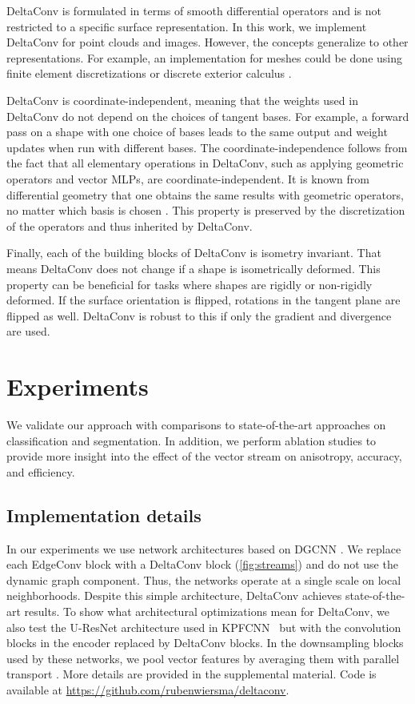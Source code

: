 \documentclass[acmtog, authorversion]{acmart}
\begin{document}
DeltaConv is formulated in terms of smooth differential operators and is not restricted to a specific surface representation. In this work, we implement DeltaConv for point clouds and images. However, the concepts generalize to other representations. For example, an implementation for meshes could be done using finite element discretizations \cite{Brandt2017} or discrete exterior calculus \cite{Crane2013DGP}.

DeltaConv is coordinate-independent, meaning that the weights used in DeltaConv do not depend on the choices of tangent bases. For example, a forward pass on a shape with one choice of bases leads to the same output and weight updates when run with different bases.
The coordinate-independence follows from the fact that all elementary operations in DeltaConv, such as applying geometric operators and vector MLPs, are coordinate-independent. It is known from differential geometry that one obtains the same results with geometric operators, no matter which basis is chosen \cite{o1983semi}. This property is preserved by the discretization of the operators and thus inherited by DeltaConv.

Finally, each of the building blocks of DeltaConv is isometry invariant. That means DeltaConv does not change if a shape is isometrically deformed. This property can be beneficial for tasks where shapes are rigidly or non-rigidly deformed. If the surface orientation is flipped, rotations in the tangent plane are flipped as well. DeltaConv is robust to this if only the gradient and divergence are used.
 \section{Experiments}
We validate our approach with comparisons to state-of-the-art approaches on classification and segmentation. In addition, we perform ablation studies to provide more insight into the effect of the vector stream on anisotropy, accuracy, and efficiency.

\subsection{Implementation details}
In our experiments we use network architectures based on DGCNN \cite{Wang2019}. We replace each EdgeConv block with a DeltaConv block (\autoref{fig:streams}) and do not use the dynamic graph component. Thus, the networks operate at a single scale on local neighborhoods. Despite this simple architecture, DeltaConv achieves state-of-the-art results. To show what architectural optimizations mean for DeltaConv, we also test the U-ResNet architecture used in KPFCNN~\cite{thomas2019KPConv} but with the convolution blocks in the encoder replaced by DeltaConv blocks. In the downsampling blocks used by these networks, we pool vector features by averaging them with parallel transport \cite{Wiersma2020}. More details are provided in the supplemental material. Code is available at \url{https://github.com/rubenwiersma/deltaconv}.
\end{document}
